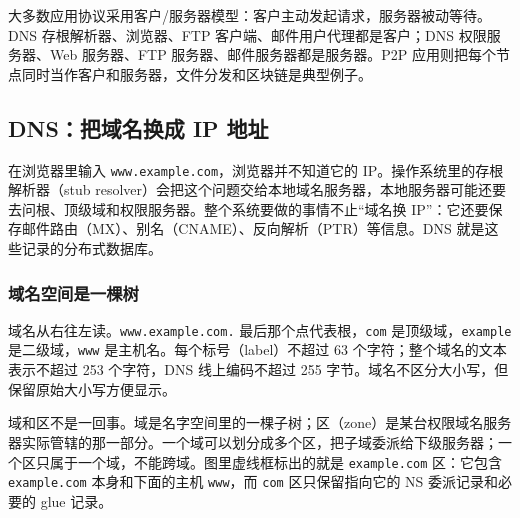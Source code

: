大多数应用协议采用客户/服务器模型：客户主动发起请求，服务器被动等待。DNS 存根解析器、浏览器、FTP 客户端、邮件用户代理都是客户；DNS 权限服务器、Web 服务器、FTP 服务器、邮件服务器都是服务器。P2P 应用则把每个节点同时当作客户和服务器，文件分发和区块链是典型例子。

\subsection{DNS：把域名换成 IP 地址}

在浏览器里输入 \texttt{www.example.com}，浏览器并不知道它的 IP。操作系统里的存根解析器（stub resolver）会把这个问题交给本地域名服务器，本地服务器可能还要去问根、顶级域和权限服务器。整个系统要做的事情不止“域名换 IP”：它还要保存邮件路由（MX）、别名（CNAME）、反向解析（PTR）等信息。DNS 就是这些记录的分布式数据库。

\subsubsection{域名空间是一棵树}

域名从右往左读。\texttt{www.example.com.} 最后那个点代表根，\texttt{com} 是顶级域，\texttt{example} 是二级域，\texttt{www} 是主机名。每个标号（label）不超过 63 个字符；整个域名的文本表示不超过 253 个字符，DNS 线上编码不超过 255 字节。域名不区分大小写，但保留原始大小写方便显示。

域和区不是一回事。域是名字空间里的一棵子树；区（zone）是某台权限域名服务器实际管辖的那一部分。一个域可以划分成多个区，把子域委派给下级服务器；一个区只属于一个域，不能跨域。图里虚线框标出的就是 \texttt{example.com} 区：它包含 \texttt{example.com} 本身和下面的主机 \texttt{www}，而 \texttt{com} 区只保留指向它的 NS 委派记录和必要的 glue 记录。

